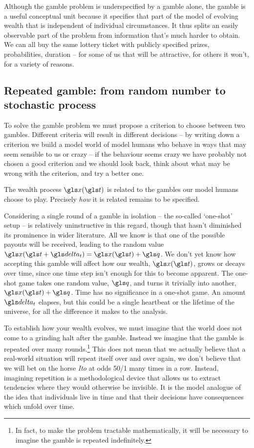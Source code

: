 Although the gamble problem is underspecified by a gamble alone, the gamble is a 
useful conceptual unit because it specifies that part of the model of evolving wealth 
that is independent of individual circumstances. It thus splits an easily observable part
of the problem from information that's much harder to obtain. We can all buy the same lottery 
ticket with publicly specified prizes, probabilities, duration -- for some of us that will be attractive, for others it won't, for a variety of reasons.

\subsection{Repeated gamble: from random number to stochastic process}
To solve the gamble problem we must propose a criterion to choose between two
gambles. Different criteria will result in different decisions -- by writing down a criterion
we build a model world of model humans who behave in ways that may seem sensible
to us or crazy -- if the behaviour seems crazy we have probably not chosen a good
criterion and we should look back, think about what may be wrong with the criterion, 
and try a better one.

The wealth process $\x(\t)$ is related to the gambles our model humans 
choose to play. Precisely {\it how} it is related remains to be specified.

Considering a single round of a gamble in isolation -- the so-called `one-shot' setup 
-- is relatively uninstructive in this regard, though that hasn't diminished its prominence in wider literature. 
All we know is 
that one of the possible payouts will be received, leading to the random value 
$\x(\t+\dt)=\x(\t)+\q$. 
We don't yet know how accepting this gamble will affect how our wealth, $\x(\t)$, grows or decays over time, since one time step isn't enough for this to become apparent. 
The one-shot game takes one random value, $\q$, and turns it trivially into 
another, $\x(\t)+\q$. Time has no significance in a 
one-shot game. An amount $\dt$ elapses, but this could be a single 
heartbeat or the lifetime of the universe, for all the difference it makes to the analysis.

To establish how your wealth evolves, we must imagine that the world does 
not come to a grinding halt after the gamble. Instead we imagine that the gamble
is repeated over many rounds.\footnote{In fact, to make the 
problem tractable mathematically, it will be necessary to imagine the gamble 
is repeated indefinitely.} This does not mean that we actually
believe that a real-world situation will repeat itself over and over again, \eg we don't
believe that we will bet on the horse \textit{Ito} at odds 50/1 many times in a row. Instead, 
imagining repetition is a methodological device that allows us to extract tendencies
where they would otherwise be invisible. It is the model analogue of 
the idea that individuals live in time and that their decisions have consequences 
which unfold over time.

